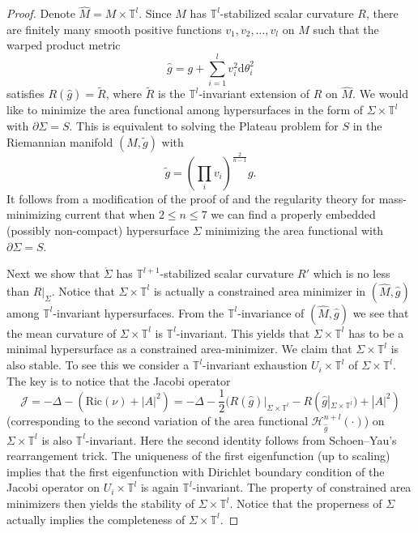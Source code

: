\documentclass[11pt,letterpaper]{amsart}
\numberwithin{equation}{section}
\theoremstyle{definition}
\begin{document}
\begin{proof}
Denote $\hat M=M\times \mathbb T^l$. Since $M$ has $\mathbb T^l$-stabilized scalar curvature $R$, there are finitely many smooth positive functions $v_1,v_2,\ldots, v_l$ on $M$ such that the warped product metric
\begin{equation}\label{Eq: hat g}
\hat g=g+\sum_{i=1}^lv_i^2\mathrm d\theta_i^2
\end{equation}
satisfies $R(\hat g)=\tilde R$, where $\tilde R$ is the $\mathbb T^l$-invariant extension of $R$ on $\hat M$. We would like to minimize the area functional among hypersurfaces in the form of $\Sigma\times \mathbb T^l$ with $\partial\Sigma=S$. This is equivalent to solving the Plateau problem for $S$ in the Riemannian manifold $(M,\tilde g)$ with
\begin{equation}\label{Eq: conformal tilde g}
\tilde g=\left(\prod_i v_i\right)^{\frac{2}{n-1}}g.
\end{equation}
It follows from a modification of the proof of \cite[Lemma 34.1]{Sim83} and the regularity theory for mass-minimizing current that when $2\leq n\leq 7$ we can find a properly embedded (possibly non-compact) hypersurface $\Sigma$ minimizing the area functional with $\partial\Sigma=S$.

Next we show that $\mathring\Sigma$ has $\mathbb T^{l+1}$-stabilized scalar curvature $R'$ which is no less than $R|_{\Sigma}$. Notice that $\Sigma \times \mathbb T^l$ is actually a constrained area minimizer in $(\hat M,\hat g)$ among $\mathbb T^l$-invariant hypersurfaces. From the $\mathbb T^l$-invariance of $(\hat M,\hat g)$ we see that the mean curvature of $\Sigma \times \mathbb T^l$ is $\mathbb T^l$-invariant. This yields that $\Sigma \times \mathbb T^l$ has to be a minimal hypersurface as a constrained area-minimizer. We claim that $\Sigma \times \mathbb T^l$ is also stable. To see this we consider a $\mathbb T^l$-invariant exhaustion $U_i\times \mathbb T^l$ of $\Sigma\times \mathbb T^l$. The key is to notice that the Jacobi operator
\begin{equation}\label{Eq: Jacobi}
\mathcal J=-\Delta-(\mathrm{Ric}(\nu)+|A|^2)
= -\Delta - \frac{1}{2}(R(\hat g)|_{\Sigma\times \mathbb T^l} - R(\hat{g}|_{\Sigma\times \mathbb T^l})+|A|^2)
\end{equation}
(corresponding to the second variation of the area functional $\mathcal H^{n+l}_{\hat g}(\cdot)$) on $\Sigma\times\mathbb T^{l}$ is also $\mathbb T^{l}$-invariant. {Here the second identity follows from Schoen--Yau's rearrangement trick.} The uniqueness of the first eigenfunction (up to scaling) implies that the first eigenfunction with Dirichlet boundary condition of the Jacobi operator on $U_i\times \mathbb T^l$ is again $\mathbb T^l$-invariant. The property of constrained area minimizers then yields the stability of $\Sigma \times \mathbb T^l$. Notice that the properness of $\Sigma$ actually implies the completeness of $\Sigma\times \mathbb T^l$.


\end{proof}
\end{document}
